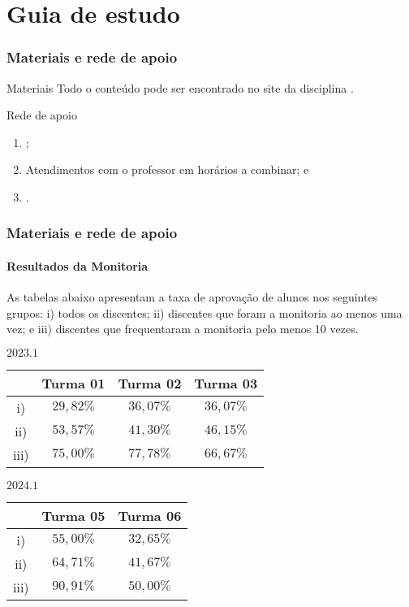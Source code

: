 \section{Guia de estudo}


\begin{frame}
	\frametitle{Materiais e rede de apoio}

	\begin{block}{Materiais}
		Todo o conteúdo pode ser encontrado no site da disciplina .
	 
   
	\end{block}
\pause
	\begin{block}{Rede de apoio}
		\begin{enumerate}
			\item {}; \pause
			\item Atendimentos com o professor em horários a combinar; \pause e
			\item {}.
		\end{enumerate}
	 
   
	\end{block}
	
\end{frame}


\begin{frame}
	\frametitle{Materiais e rede de apoio}
	\framesubtitle{Resultados da Monitoria} 
As tabelas abaixo apresentam a taxa de aprovação de alunos nos seguintes grupos: i) todos os discentes; ii) discentes que foram a monitoria ao menos uma vez; e iii) discentes que frequentaram a monitoria pelo menos 10 vezes.
	\begin{center}
		$2023.1$
		\begin{tabular}{|c|c|c|c|}
			\hline
			 	&  Turma 01 & Turma 02 & Turma 03 \\ \hline
			i)	& $29{,}82\%$ & $36{,}07\%$ & $36{,}07\%$ \\ \hline
			ii)	& $53{,}57\%$ & $41{,}30\%$ & $46{,}15\%$ \\ \hline
			iii)	&$75{,}00\%$  & $77{,}78\%$ & $66{,}67\%$ \\
			\hline
		\end{tabular}
	\end{center}

	\begin{center}
			$2024.1$
			\begin{tabular}{|c|c|c|}
				\hline
			 	&  Turma 05 & Turma 06  \\ \hline
			i)	& $55{,}00\%$ & $32{,}65\%$  \\ \hline
			ii)	& $64{,}71\%$ & $41{,}67\%$  \\ \hline
			iii)& $90{,}91\%$ & $50{,}00\%$  \\
			\hline
			\end{tabular}
	\end{center}
\end{frame}
